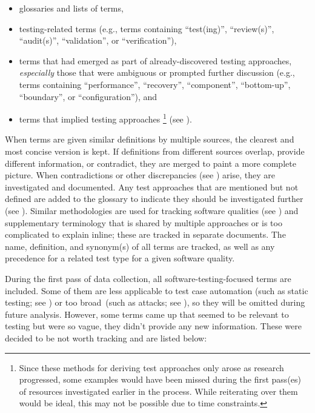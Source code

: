 \begin{itemize}
    \item glossaries and lists of terms,
    \item testing-related terms (e.g., terms containing ``test(ing)'',
          \ifnotpaper ``review(s)'', ``audit(s)'', \fi
          ``validation'', or ``verification''),
    \item terms that had emerged as part of already-discovered
          testing approaches, \emph{especially} those that were ambiguous
          or prompted further discussion (e.g., terms containing
          ``performance'', ``recovery'', ``component'', ``bottom-up'',
          \ifnotpaper ``boundary'', \fi or ``configuration''), and
    \item terms that implied testing approaches%
          \ifnotpaper\footnote{
                  Since these methods for deriving test approaches only arose
                  as research progressed, some examples would have been missed
                  during the first pass(es) of resources investigated earlier
                  in the process. While reiterating over them would be ideal,
                  this may not be possible due to time constraints.
              } (see )\fi.
\end{itemize}

When terms are given similar definitions by multiple sources, the clearest and
most concise version is kept. If definitions from different sources overlap,
provide different information, or contradict, they are merged to paint a more
complete picture. When contradictions or other discrepancies (see
) arise, they are investigated and documented. Any test
approaches that are mentioned but not defined are added to the glossary to
indicate they should be investigated further (see ).
Similar methodologies are used for tracking software qualities \ifnotpaper (see
    ) \fi and supplementary terminology that is shared by
multiple approaches or is too complicated to explain inline; these are tracked
in separate documents. The name, definition, and synonym(s) of all terms are
tracked, as well as any precedence for a related test type for a given software
quality.

During the first pass of data collection, all software-testing-focused terms
are included. Some of them are less applicable to test case automation
\ifnotpaper (such as static testing; see )
\fi or too broad\ifnotpaper\ (such as attacks; see %
    )\fi, so they will be omitted during future analysis.
\ifnotpaper
    However, some terms came up that seemed to be relevant to
    testing but were so vague, they didn't provide any new information. These were
    decided to be not worth tracking and are listed below:

